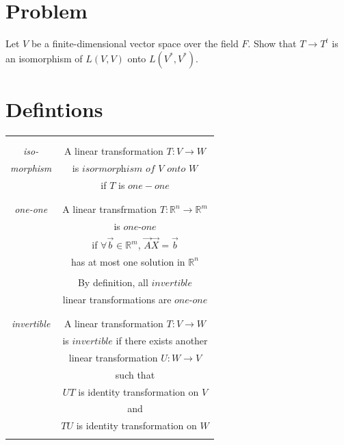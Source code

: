 \documentclass[journal,12pt,twocolumn]{IEEEtran}
\begin{document}
\section{Problem}
Let $V$ be a finite-dimensional vector space over the field $F$. Show that $T \rightarrow T^t$ is an isomorphism of $L(V,V)$ onto $L(V^*,V^*)$.
\section{Defintions}
\begin{table}[h]
	\begin{center}
		\begin{tabular}{|c|c|}
			\hline
			& \\
			& \\
			\textit{iso-} & A linear transformation $T : V\rightarrow W$\\
			\textit{morphism} & is $\textit{isormorphism of}$ $V$ $\textit{onto}$ $W$\\
			& if $T$ is $one-one$\\
			& \\
			\hline	
			& \\		
			\textit{one-one} & A linear transfrmation $T : \mathbb{R}^{n} \rightarrow \mathbb{R}^{m}$\\
			& is $\textit{one-one}$\\
			& if $\forall \vec{b} \in \mathbb{R}^{m}$,  $\vec{A}\vec{X} =\vec{b}$\\
			& has at most one solution in $\mathbb{R}^{n}$\\
			& \\
			& By definition, all $invertible$\\
			& linear transformations are $\textit{one-one}$\\
			& \\
			\hline
			& \\
			\textit{invertible} & A linear transformation $T : V \rightarrow W$\\
			& is $\textit{invertible}$ if there exists another\\
			& linear transformation $U: W \rightarrow V$\\
			& such that\\
			& $UT$ is identity transformation on $V$\\
			& and \\
			& $TU$ is identity transformation on $W$\\
			& \\
			\hline
		\end{tabular}
	\end{center}
\end{table}
\pagebreak
\end{document}
